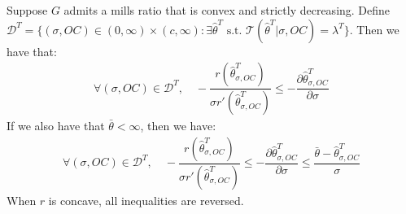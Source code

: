 \begin{lemma}\label{lemma:ineq}
Suppose $G$ admits a mills ratio that is convex and strictly decreasing. Define $\mathcal{D}^T = \{(\sigma,OC)\in(0,\infty)\times (c,\infty): \exists \hat{\theta}^T \text{ s.t. } \mathcal{T}(\hat{\theta}^T|\sigma,OC) = \lambda^T\}$. Then we have that:
\begin{align*}
    \forall (\sigma,OC)\in \mathcal{D}^T,\quad -\dfrac{r(\hat{\theta}^T_{\sigma,OC})}{\sigma r'(\hat{\theta}^T_{\sigma,OC})} \leq -\dfrac{\partial \hat{\theta}^T_{\sigma,OC}}{\partial \sigma} 
\end{align*}
If we also have that $\bar{\theta}<\infty$, then we have:
\begin{align*}
 \forall (\sigma,OC)\in \mathcal{D}^T,\quad -\dfrac{r(\hat{\theta}^T_{\sigma,OC})}{\sigma r'(\hat{\theta}^T_{\sigma,OC})} \leq -\dfrac{\partial \hat{\theta}^T_{\sigma,OC}}{\partial \sigma}  \leq \dfrac{\bar{\theta} - \hat{\theta}^T_{\sigma,OC}}{\sigma}
\end{align*}
When $r$ is concave, all inequalities are reversed. 
\end{lemma}


